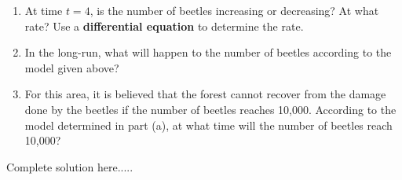 \begin{example}
\begin{enumerate}[leftmargin=*]
    \item At time $t=4$, is the number of beetles increasing or decreasing? At what rate? Use a \textbf{differential equation} to determine the rate.    
    \newpage
    \item In the long-run, what will happen to the number of beetles according to the model given above?	
    \item For this area, it is believed that the forest cannot recover from the damage done by the beetles if the number of beetles reaches 10,000.  According to the model determined in part (a), at what time will the number of beetles reach 10,000?   
\end{enumerate}
    \begin{sol}
    \end{sol}
    \begin{solL}
    Complete solution here.....
    
    \end{solL}
    
\end{example}
\newpage

